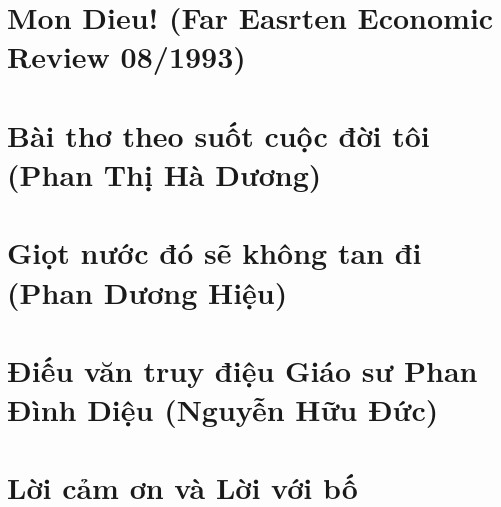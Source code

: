 \documentclass[11pt,twoside]{extreport}
\begin{document}
\chapter{Mon Dieu!  (Far Easrten Economic Review 08/1993)}



\chapter{Bài thơ theo suốt cuộc đời tôi (Phan Thị Hà Dương)}


\chapter{Giọt nước đó sẽ không tan đi (Phan Dương Hiệu)}


\chapter{Điếu văn truy điệu Giáo sư Phan Đình Diệu (Nguyễn Hữu Đức)}


\chapter{Lời cảm ơn và Lời với bố }


\end{document}
